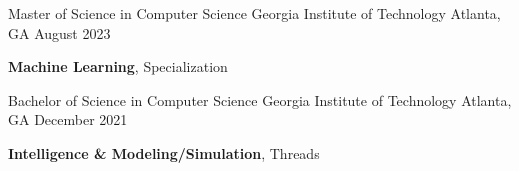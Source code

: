 
\begin{cventries}
    \cventry
    {Master of Science in Computer Science} %
    {Georgia Institute of Technology} %
    {Atlanta, GA} %
    {August 2023} %
    {
      \begin{cvitems} %
         \item {\textbf{Machine Learning}, Specialization}
      \end{cvitems}
    }
    \cventry
        {Bachelor of Science in Computer Science} %
        {Georgia Institute of Technology} %
        {Atlanta, GA} %
        {December 2021} %
        {
          \begin{cvitems} %
             \item {\textbf{Intelligence \& Modeling/Simulation}, Threads}
          \end{cvitems}
        }
\end{cventries}
